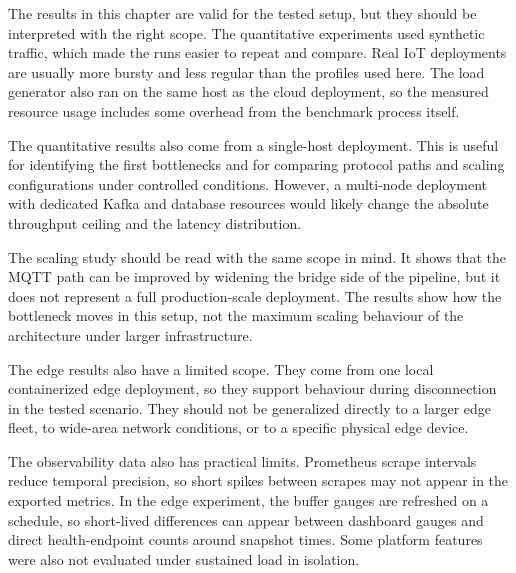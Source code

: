 The results in this chapter are valid for the tested setup, but they should be interpreted with the right scope. The quantitative experiments used synthetic traffic, which made the runs easier to repeat and compare. Real \gls{IoT} deployments are usually more bursty and less regular than the profiles used here. The load generator also ran on the same host as the cloud deployment, so the measured resource usage includes some overhead from the benchmark process itself.

The quantitative results also come from a single-host deployment. This is useful for identifying the first bottlenecks and for comparing protocol paths and scaling configurations under controlled conditions. However, a multi-node deployment with dedicated Kafka and database resources would likely change the absolute throughput ceiling and the latency distribution.

The scaling study should be read with the same scope in mind. It shows that the \gls{MQTT} path can be improved by widening the bridge side of the pipeline, but it does not represent a full production-scale deployment. The results show how the bottleneck moves in this setup, not the maximum scaling behaviour of the architecture under larger infrastructure.

The edge results also have a limited scope. They come from one local containerized edge deployment, so they support behaviour during disconnection in the tested scenario. They should not be generalized directly to a larger edge fleet, to wide-area network conditions, or to a specific physical edge device.

The observability data also has practical limits. Prometheus scrape intervals reduce temporal precision, so short spikes between scrapes may not appear in the exported metrics. In the edge experiment, the buffer gauges are refreshed on a schedule, so short-lived differences can appear between dashboard gauges and direct health-endpoint counts around snapshot times. Some platform features were also not evaluated under sustained load in isolation.
